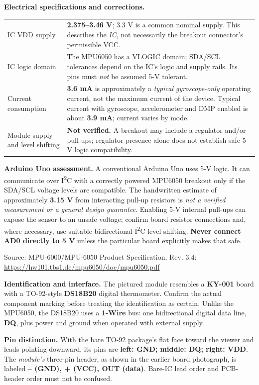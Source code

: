 \documentclass[11pt,a4paper]{article}
\newcommand{\sect}[1]{\vspace{6pt}{\color{navy}\large\bfseries #1}\par\vspace{2pt}}
\newcommand{\source}[1]{{\footnotesize\color{teal}Source: #1}}
\begin{document}
\textbf{Electrical specifications and corrections.}\par
\begin{tabularx}{\linewidth}{@{}p{39mm}X@{}}\toprule
IC VDD supply & \textbf{2.375--3.46 V}; 3.3 V is a common nominal supply. This describes the \emph{IC}, not necessarily the breakout connector's permissible VCC.\\
IC logic domain & The MPU6050 has a VLOGIC domain; SDA/SCL tolerances depend on the IC's logic and supply rails. Its pins must \emph{not} be assumed 5-V tolerant.\\
Current consumption & \textbf{3.6 mA} is approximately a \emph{typical gyroscope-only} operating current, not the maximum current of the device. Typical current with gyroscope, accelerometer and DMP enabled is about \textbf{3.9 mA}; current varies by mode.\\
Module supply and level shifting & \textbf{Not verified.} A breakout may include a regulator and/or pull-ups; regulator presence alone does not establish safe 5-V logic compatibility.\\
\bottomrule\end{tabularx}

\textbf{Arduino Uno assessment.} A conventional Arduino Uno uses 5-V logic. It can communicate over I\textsuperscript{2}C with a correctly powered MPU6050 breakout only if the SDA/SCL voltage levels are compatible. The handwritten estimate of approximately \textbf{3.15 V} from interacting pull-up resistors is \emph{not a verified measurement or a general design guarantee}. Enabling 5-V internal pull-ups can expose the sensor to an unsafe voltage; confirm board resistor connections and, where necessary, use suitable bidirectional I\textsuperscript{2}C level shifting. \textbf{Never connect AD0 directly to 5 V} unless the particular board explicitly makes that safe.

\source{MPU-6000/MPU-6050 Product Specification, Rev. 3.4: \url{https://hw101.tbs1.de/mpu6050/doc/mpu6050.pdf}}

\sect{2. DS18B20 temperature-sensing module}
\textbf{Identification and interface.} The pictured module resembles a \textbf{KY-001} board with a TO-92-style \textbf{DS18B20} digital thermometer. Confirm the actual component marking before treating the identification as certain. Unlike the MPU6050, the DS18B20 uses a \textbf{1-Wire} bus: one bidirectional digital data line, \textbf{DQ}, plus power and ground when operated with external supply.

\textbf{Pin distinction.} With the bare TO-92 package's flat face toward the viewer and leads pointing downward, its pins are \textbf{left: GND; middle: DQ; right: VDD}. The \emph{module's} three-pin header, as shown in the earlier board photograph, is labeled \textbf{-- (GND), + (VCC), OUT (data)}. Bare-IC lead order and PCB-header order must not be confused.
\end{document}
